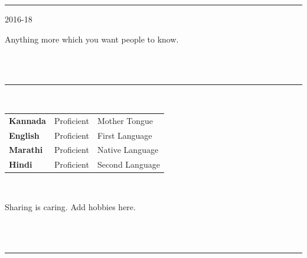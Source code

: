 \documentclass[11pt]{anirudhcv}
\begin{document}
\noindent\color{black}\rule{0.81\paperwidth}{0.5ex}
\newline
{}\hfill{}

\parbox[t]{0.175\textwidth}{2016-18}\parbox[t]{0.825\textwidth}{{\large Anything more which you want people to know.}}\\\\

\noindent\color{black}\rule{0.81\paperwidth}{0.5ex}

		   \vspace{-0.9em}\begin{minipage}[t]{0.5\textwidth}
	\vspace{-\baselineskip} %

	\\
	\addtolength\tabcolsep{10pt}\renewcommand{\arraystretch}{1.25}
\begin{tabular}{l l l}
		\textbf{Kannada} & Proficient & Mother Tongue\\
		\textbf{English} & Proficient & First Language\\
		\textbf{Marathi} & Proficient & Native Language\\
		\textbf{Hindi} & Proficient & Second Language\\
	\end{tabular}\\
\end{minipage}
\hfill
		   \vspace{-0.9em}\begin{minipage}[t]{0.4\textwidth}
	\vspace{-\baselineskip} %
	
	
	Sharing is caring. Add hobbies here.
	
\end{minipage}\\\\

\noindent\color{black}\rule{0.81\paperwidth}{0.5ex}
\newline
{}\hfill{}
\end{document}
